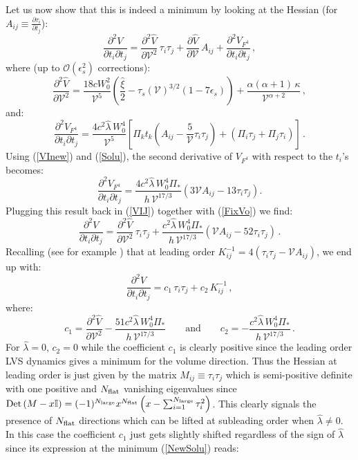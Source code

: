 \documentclass[11pt,a4paper]{article}
\newcommand{\be}{\begin{equation}}
\newcommand{\ee}{\end{equation}}
\newcommand\vo{{\mathcal{V}}}
\newcommand{\mc}{\mathcal}
\begin{document}
Let us now show that this is indeed a minimum by looking at the Hessian (for $A_{ij}\equiv \frac{\partial \tau_i}{\partial t_j}$):
\be
\frac{\partial^2 V}{\partial t_i \partial t_j} = \frac{\partial^2 \hat{V}}{\partial \vo^2}\,\tau_i\tau_j +\frac{\partial \hat{V}}{\partial \vo}\, A_{ij}+ \frac{\partial^2 V_{F^4}}{\partial t_i \partial t_j}\,,
\label{VIJ}
\ee
where (up to $\mc{O}(\epsilon_s^2)$ corrections):
\be
\frac{\partial^2 \hat{V}}{\partial \vo^2} = \frac{18 c W_0^2}{\vo^5} \left(\frac{\hat\xi}{2}-\tau_s(\vo)^{3/2}\left(1-7\epsilon_s\right)\right)+\frac{\alpha(\alpha+1)\,\kappa}{\vo^{\alpha+2}}\,,
\label{hatVvovo}
\ee
and:
\be
\frac{\partial^2 V_{F^4}}{\partial t_i \partial t_j} = \frac{4c^2\hat\lambda\,W_0^4}{\vo^5}\left[\Pi_k t_k \left(A_{ij} -\frac{5}{\vo}\tau_i\tau_j\right)+ \left(\Pi_i\tau_j + \Pi_j\tau_i\right) \right]\,.
\ee
Using (\ref{VInew}) and (\ref{Solu}), the second derivative of $V_{F^4}$ with respect to the $t_i$'s becomes:
\be
\frac{\partial^2 V_{F^4}}{\partial t_i \partial t_j} = \frac{4c^2\hat\lambda\,W_0^4\Pi_*}{h\,\vo^{17/3}}\left(3\vo A_{ij}-  13\tau_i\tau_j \right).
\ee
Plugging this result back in (\ref{VIJ}) together with (\ref{FixVo}) we find:
\be
\frac{\partial^2 V}{\partial t_i \partial t_j} = \frac{\partial^2 \hat{V}}{\partial \vo^2}\,\tau_i\tau_j 
+ \frac{c^2\hat\lambda\,W_0^4\Pi_*}{h\,\vo^{17/3}}\left(\vo A_{ij}-  52\tau_i\tau_j \right) \,.
\label{VIJnew}
\ee
Recalling (see for example \cite{Berg:2007wt, Cicoli:2007xp}) that at leading order $K^{-1}_{ij}=4\left(\tau_i\tau_j-\vo A_{ij}\right)$, we end up with:
\be
\frac{\partial^2 V}{\partial t_i \partial t_j} = c_1 \,\tau_i\tau_j+c_2 \,K^{-1}_{ij} \,,
\label{VIJfinal}
\ee
where:
\be
c_1 = \frac{\partial^2 \hat{V}}{\partial \vo^2} - \frac{51c^2\hat\lambda\,W_0^4\Pi_*}{h\,\vo^{17/3}}
\qquad\text{and}\qquad c_2 = - \frac{c^2\hat\lambda\,W_0^4\Pi_*}{h\,\vo^{17/3}} \,.
\label{c1c2}
\ee
For $\hat\lambda=0$, $c_2=0$ while the coefficient $c_1$ is clearly positive since the leading order LVS dynamics gives a minimum for the volume direction. Thus the Hessian at leading order is just given by the matrix $M_{ij}\equiv \tau_i\tau_j$ which is semi-positive definite with one positive and $N_{\rm flat}$ vanishing eigenvalues since ${\rm Det}\left(M-x\mathbb{I}\right) = (-1)^{N_{\rm large}} x^{N_{\rm flat}} \left(x- \sum_{i=1}^{N_{\rm large}} \tau_i^2\right)$. This clearly signals the presence of $N_{\rm flat}$ directions which can be lifted at subleading order when $\hat\lambda\neq 0$. In this case the coefficient $c_1$ just gets slightly shifted regardless of the sign of $\hat\lambda$ since its expression at the minimum (\ref{NewSolu}) reads: 
\end{document}
